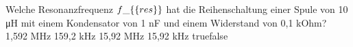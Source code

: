     {Welche Resonanzfrequenz $f\_\{\textrm\{res\}\}$ hat die Reihenschaltung einer Spule von 10 μH mit einem Kondensator von 1 nF und einem Widerstand von 0,1 kOhm?}
    {1,592 MHz}
    {159,2 kHz}
    {15,92 MHz}
    {15,92 kHz}
    {true}{false}
